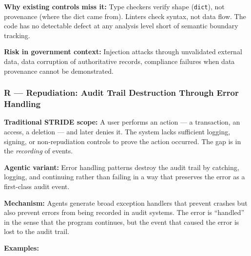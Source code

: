 \documentclass[a4paper,11pt]{report}
\begin{document}
\textbf{Why existing controls miss it:} Type checkers verify shape
(\texttt{dict}), not provenance (where the dict came from). Linters
check syntax, not data flow. The code has no detectable defect at any
analysis level short of semantic boundary tracking.

\textbf{Risk in government context:} Injection attacks through
unvalidated external data, data corruption of authoritative records,
compliance failures when data provenance cannot be demonstrated.

\hypertarget{r-repudiation-audit-trail-destruction-through-error-handling}{%
\subsubsection{R --- Repudiation: Audit Trail Destruction Through Error
Handling}\label{r-repudiation-audit-trail-destruction-through-error-handling}}

\textbf{Traditional STRIDE scope:} A user performs an action --- a
transaction, an access, a deletion --- and later denies it. The system
lacks sufficient logging, signing, or non-repudiation controls to prove
the action occurred. The gap is in the \emph{recording} of events.

\textbf{Agentic variant:} Error handling patterns destroy the audit
trail by catching, logging, and continuing rather than failing in a way
that preserves the error as a first-class audit event.

\textbf{Mechanism:} Agents generate broad exception handlers that
prevent crashes but also prevent errors from being recorded in audit
systems. The error is ``handled'' in the sense that the program
continues, but the event that caused the error is lost to the audit
trail.

\textbf{Examples:}
\end{document}
